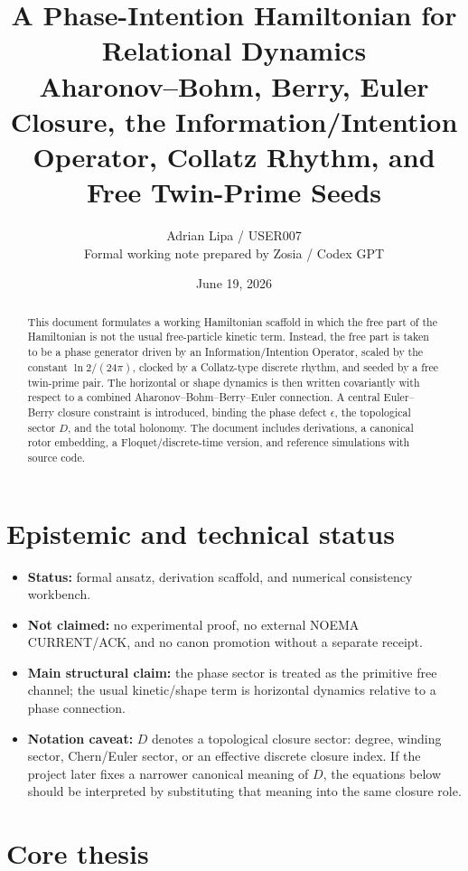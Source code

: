 \documentclass[11pt,a4paper]{article}
\title{\textbf{A Phase-Intention Hamiltonian for Relational Dynamics}\\[2mm]
\large Aharonov--Bohm, Berry, Euler Closure, the Information/Intention Operator, Collatz Rhythm, and Free Twin-Prime Seeds}
\author{Adrian Lipa / USER007\\Formal working note prepared by Zosia / Codex GPT}
\date{June 19, 2026}
\begin{document}
\maketitle

\begin{abstract}
This document formulates a working Hamiltonian scaffold in which the free part of the Hamiltonian is not the usual free-particle kinetic term. Instead, the free part is taken to be a phase generator driven by an Information/Intention Operator, scaled by the constant $\ln 2/(24\pi)$, clocked by a Collatz-type discrete rhythm, and seeded by a free twin-prime pair. The horizontal or shape dynamics is then written covariantly with respect to a combined Aharonov--Bohm--Berry--Euler connection. A central Euler--Berry closure constraint is introduced, binding the phase defect $\epsilon$, the topological sector $D$, and the total holonomy. The document includes derivations, a canonical rotor embedding, a Floquet/discrete-time version, and reference simulations with source code.
\end{abstract}

\section*{Epistemic and technical status}
\begin{itemize}[leftmargin=*]
  \item \textbf{Status:} formal ansatz, derivation scaffold, and numerical consistency workbench.
  \item \textbf{Not claimed:} no experimental proof, no external NOEMA CURRENT/ACK, and no canon promotion without a separate receipt.
  \item \textbf{Main structural claim:} the phase sector is treated as the primitive free channel; the usual kinetic/shape term is horizontal dynamics relative to a phase connection.
  \item \textbf{Notation caveat:} $D$ denotes a topological closure sector: degree, winding sector, Chern/Euler sector, or an effective discrete closure index. If the project later fixes a narrower canonical meaning of $D$, the equations below should be interpreted by substituting that meaning into the same closure role.
\end{itemize}

\tableofcontents
\newpage

\section{Core thesis}
\end{document}
